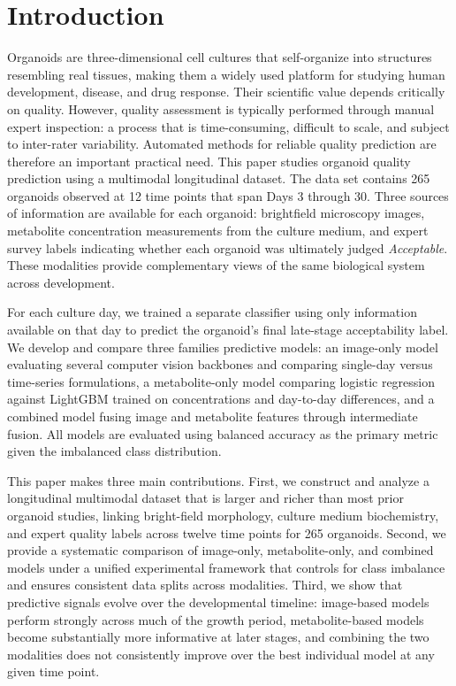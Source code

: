 \documentclass{article}
\begin{document}
\section{Introduction}
Organoids are three-dimensional cell cultures that self-organize into structures resembling real tissues, making them a widely used platform for studying human development, disease, and drug response. Their scientific value depends critically on quality. However, quality assessment is typically performed through manual expert inspection: a process that is time-consuming, difficult to scale, and subject to inter-rater variability. Automated methods for reliable quality prediction are therefore an important practical need. This paper studies organoid quality prediction using a multimodal longitudinal dataset. The data set contains 265 organoids observed at 12 time points that span Days 3 through 30. Three sources of information are available for each organoid: brightfield microscopy images, metabolite concentration measurements from the culture medium, and expert survey labels indicating whether each organoid was ultimately judged \textit{Acceptable}. These modalities provide complementary views of the same biological system across development. 

For each culture day, we trained a separate classifier using only information available on that day to predict the organoid's final late-stage acceptability label. We develop and compare three families predictive models: an image-only model evaluating several computer vision backbones and comparing single-day versus time-series formulations, a metabolite-only model comparing logistic regression against LightGBM trained on concentrations and day-to-day differences, and a combined model fusing image and metabolite features through intermediate fusion. All models are evaluated using balanced accuracy as the primary metric given the imbalanced class distribution.

This paper makes three main contributions. First, we construct and analyze a longitudinal multimodal dataset that is larger and richer than most prior organoid studies, linking bright-field morphology, culture medium biochemistry, and expert quality labels across twelve time points for 265 organoids. Second, we provide a systematic comparison of image-only, metabolite-only, and combined models under a unified experimental framework that controls for class imbalance and ensures consistent data splits across modalities. Third, we show that predictive signals evolve over the developmental timeline: image-based models perform strongly across much of the growth period, metabolite-based models become substantially more informative at later stages, and combining the two modalities does not consistently improve over the best individual model at any given time point.
\end{document}
